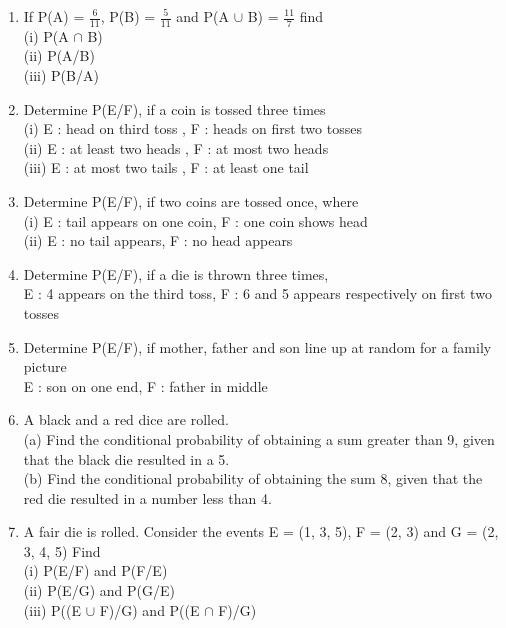 \begin{enumerate}[label=\arabic*.,ref=\thesubsection.\theenumi]
\item If P(A) = $\frac{6}{11}$, P(B) = $\frac{5}{11}$ and P(A $\cup$ B) = $\frac{11}{7}$ find\\
(i) P(A $\cap$ B)\\ 
(ii) P(A/B)\\ 
(iii) P(B/A)\\

\item Determine P(E/F), if a coin is tossed three times\\
(i) E : head on third toss , F : heads on first two tosses\\
(ii) E : at least two heads , F : at most two heads\\
(iii) E : at most two tails , F : at least one tail\\

\item Determine P(E/F), if two coins are tossed once, where\\
(i) E : tail appears on one coin, F : one coin shows head\\
(ii) E : no tail appears, F : no head appears\\

\item Determine P(E/F), if a die is thrown three times,\\
E : 4 appears on the third toss, F : 6 and 5 appears respectively on first two tosses\\

\item Determine P(E/F), if mother, father and son line up at random for a family picture\\
E : son on one end, F : father in middle\\

\item A black and a red dice are rolled.\\
(a) Find the conditional probability of obtaining a sum greater than 9, given that the black die resulted in a 5.\\
(b) Find the conditional probability of obtaining the sum 8, given that the red die resulted in a number less than 4.\\

\item A fair die is rolled. Consider the events E =  (1, 3, 5), F = (2, 3) and G = (2, 3, 4, 5) Find\\
(i) P(E/F) and P(F/E) \\
(ii) P(E/G) and P(G/E)\\
(iii) P((E $\cup$ F)/G) and P((E $\cap$ F)/G)\\


\end{enumerate}
